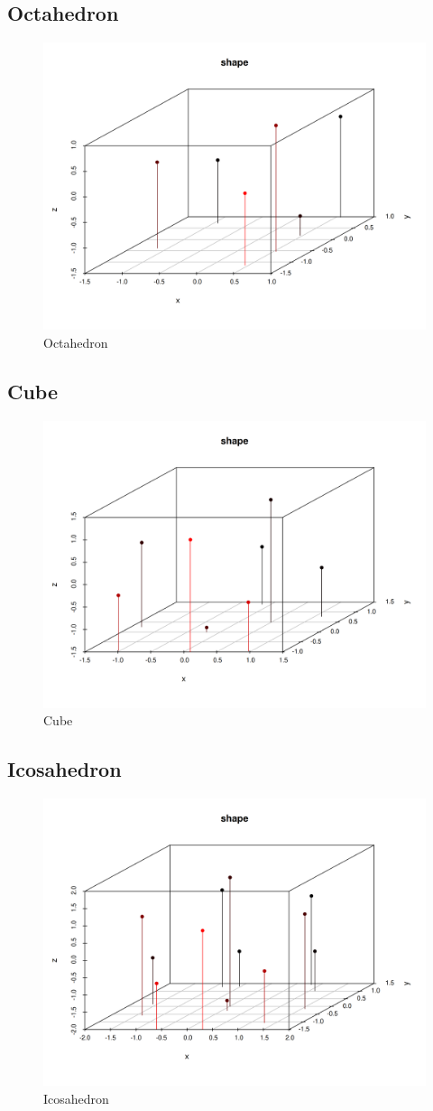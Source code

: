 \documentclass[prb,twocolumn]{revtex4-2}
\begin{document}
\subsection{Octahedron}
\begin{figure}[H]
    \centerline{\includegraphics [width=3 in] {img/octa.png}}
    \caption{Octahedron} \label{q1}
\end{figure}

\subsection{Cube}
\begin{figure}[H]
    \centerline{\includegraphics [width=3 in] {img/cube.png}}
    \caption{Cube} \label{q1}
\end{figure}

\subsection{Icosahedron}
\begin{figure}[H]
    \centerline{\includegraphics [width=3 in] {img/icosa.png}}
    \caption{Icosahedron} \label{q1}
\end{figure}
\end{document}
